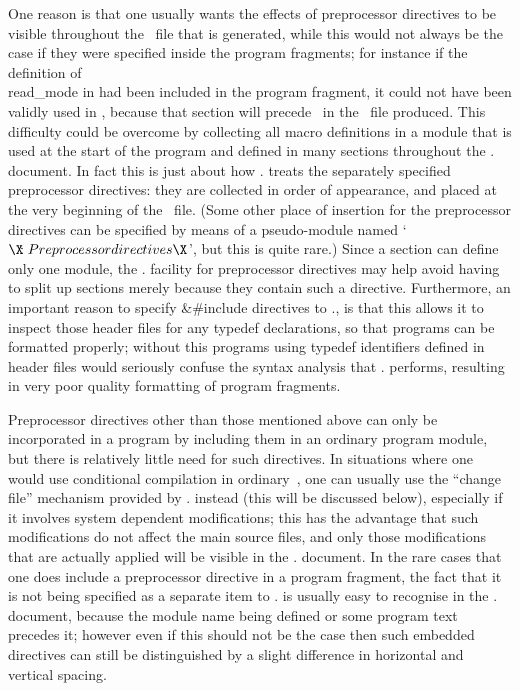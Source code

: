 One reason is that one usually wants the effects of preprocessor directives
to be visible throughout the \Cee~file that is generated, while this would
not always be the case if they were specified inside the program fragments;
for instance if the definition of \\{read\_mode} in  had been included
in the program fragment, it could not have been validly used in ,
because that section will precede~ in the \Cee~file produced. This
difficulty could be overcome by collecting all macro definitions in a module
that is used at the start of the program and defined in many sections
throughout the \CWEB. document. In fact this is just about how \CWEB. treats
the separately specified preprocessor directives: they are collected in
order of appearance, and placed at the very beginning of the \Cee~file.
(Some other place of insertion for the preprocessor directives can be
specified by means of a pseudo-module named `$\ATP$', but this is quite
rare.) Since a section can define only one module, the \CWEB. facility for
preprocessor directives may help avoid having to split up sections merely
because they contain such a directive. Furthermore, an important reason to
specify \&{\#include} directives to \CWEB., is that this allows it to
inspect those header files for any typedef declarations, so that programs
can be formatted properly; without this programs using typedef identifiers
defined in header files would seriously confuse the syntax analysis that
\CWEB.  performs, resulting in very poor quality formatting of program
fragments.

Preprocessor directives other than those mentioned above can only be
incorporated in a program by including them in an ordinary program module,
but there is relatively little need for such directives. In situations where
one would use conditional compilation in ordinary~\Cee, one can usually use
the ``change file'' mechanism provided by \CWEB. instead (this will be
discussed below), especially if it involves system dependent modifications;
this has the advantage that such modifications do not affect the main source
files, and only those modifications that are actually applied will be
visible in the \CWEB. document. In the rare cases that one does include a
preprocessor directive in a program fragment, the fact that it is not being
specified as a separate item to \CWEB. is usually easy to recognise in the
\CWEB. document, because the module name being defined or some program text
precedes it; however even if this should not be the case then such embedded
directives can still be distinguished by a slight difference in horizontal
and vertical spacing.

